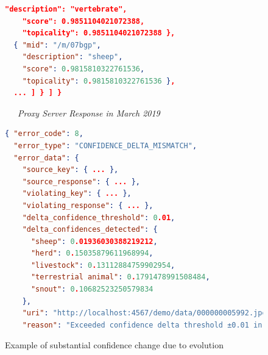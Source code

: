 \begin{figure}
\begin{framed}
\begin{minipage}{\linewidth}
\begin{lstlisting}[language=json]
    "description": "vertebrate",
    "score": 0.9851104021072388,
    "topicality": 0.9851104021072388 },
  { "mid": "/m/07bgp",
    "description": "sheep",
    "score": 0.9815810322761536,
    "topicality": 0.9815810322761536 },
  ... ] } ] }
        \end{lstlisting}
    \end{minipage}
    \begin{minipage}{\linewidth}
        \noindent\xrfill[0.45ex]{.5pt}~~~\textit{Proxy Server Response in March 2019}~~~\xrfill[0.45ex]{.5pt}
        \begin{lstlisting}[language=json]
{ "error_code": 8,
  "error_type": "CONFIDENCE_DELTA_MISMATCH",
  "error_data": {
    "source_key": { ... },
    "source_response": { ... },
    "violating_key": { ... },
    "violating_response": { ... },
    "delta_confidence_threshold": 0.01,
    "delta_confidences_detected": {
      "sheep": 0.01936030388219212,
      "herd": 0.15035879611968994,
      "livestock": 0.13112884759902954,
      "terrestrial animal": 0.1791478991508484,
      "snout": 0.10682523250579834
    },
    "uri": "http://localhost:4567/demo/data/000000005992.jpeg",
    "reason": "Exceeded confidence delta threshold ±0.01 in 5 labels (delta mean=+0.1174)." } }
        \end{lstlisting}
    \end{minipage}
    \end{framed}
    \caption{Example of substantial confidence change due to evolution}
    \label{fig:example-confidence-delta}
\end{figure}
